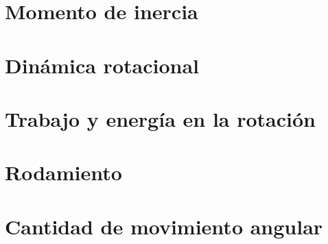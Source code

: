 ﻿\documentclass[11pt,letterpaper,openany]{book}
\newcommand{\rutaraiz}{../..}
\begin{document}




\chapter{Momento de inercia}





\chapter{Dinámica rotacional}





\chapter{Trabajo y energía en la rotación}





\chapter{Rodamiento}





\chapter{Cantidad de movimiento angular}
\end{document}
